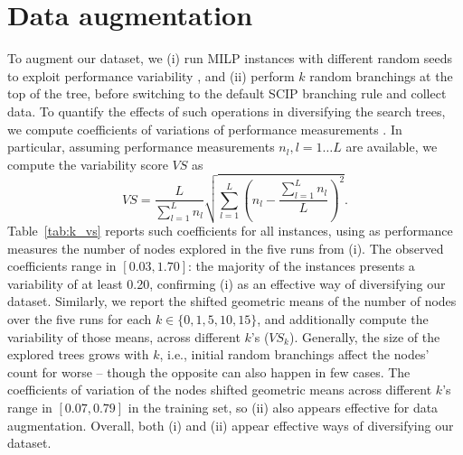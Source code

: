 \documentclass[letterpaper]{article} %
\begin{document}
\section{Data augmentation}
\label{app:data-aug}

To augment our dataset, we (i) run MILP instances with different random seeds to exploit performance variability \cite{LodiPerfVar}, and (ii) perform $k$ random branchings at the top of the tree, before switching to the default SCIP branching rule and collect data. To quantify the effects of such operations in diversifying the search trees, we compute coefficients of variations of performance measurements \cite{MIPLIB2010}. In particular, assuming performance measurements $n_l, l=1\dots L$ are available, we compute the variability score $\mathit{VS}$ as
\begin{equation}
    \mathit{VS} = \frac{L}{\sum_{l=1}^L n_l}\sqrt{\sum_{l=1}^L \left(n_l - \frac{\sum_{l=1}^L n_l}{L}\right)^2}.
\end{equation}
Table~\ref{tab:k_vs} reports such coefficients for all instances, using as performance measures the number of nodes explored in the five runs from (i). The observed coefficients range in $[0.03, 1.70]$: the majority of the instances presents a variability of at least 0.20, confirming (i) as an effective way of diversifying our dataset. Similarly, we report the shifted geometric means of the number of nodes over the five runs for each $k\in\{0, 1, 5, 10, 15\}$, and additionally compute the variability of those means, across different $k$'s ($\mathit{VS}_k$). Generally, the size of the explored trees grows with $k$, i.e., initial random branchings affect the nodes' count for worse -- though the opposite can also happen in few cases. The coefficients of variation of the nodes shifted geometric means across different $k$'s range in $[0.07, 0.79]$ in the training set, so (ii) also appears effective for data augmentation. Overall, both (i) and (ii) appear effective ways of diversifying our dataset.
\end{document}

